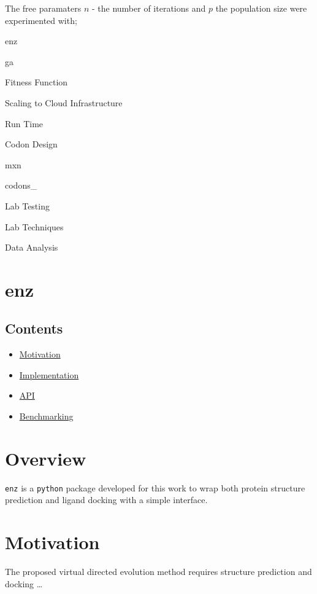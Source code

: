 The free paramaters \(n\) - the number of iterations and \(p\) the
population size were experimented with;

enz

ga

Fitness Function

Scaling to Cloud Infrastructure

Run Time

Codon Design

mxn

codons\_

Lab Testing

Lab Techniques

Data Analysis

\hypertarget{enz}{%
\section{enz}\label{enz}}

\hypertarget{contents-13}{%
\subsection{Contents}\label{contents-13}}

\begin{itemize}
\tightlist
\item
  \protect\hyperlink{}{Motivation}
\item
  \protect\hyperlink{}{Implementation}
\item
  \protect\hyperlink{}{API}
\item
  \protect\hyperlink{}{Benchmarking}
\end{itemize}

\hypertarget{overview-6}{%
\section{Overview}\label{overview-6}}

\texttt{enz} is a \texttt{python} package developed for this work to
wrap both protein structure prediction and ligand docking with a simple
interface.

\hypertarget{motivation}{%
\section{Motivation}\label{motivation}}

The proposed virtual directed evolution method requires structure
prediction and docking \ldots{}

